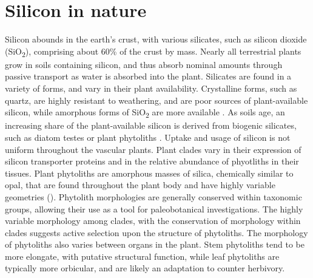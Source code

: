 \documentclass[12pt, letterpaper, ]{report}
\begin{document}
\section{Silicon in nature}

Silicon abounds in the earth’s crust, with various silicates, such as silicon dioxide (SiO\textsubscript{2}), comprising about 60\% of the crust by mass. Nearly all terrestrial plants grow in soils containing silicon, and thus absorb nominal amounts through passive transport as water is absorbed into the plant. Silicates are found in a variety of forms, and vary in their plant availability. Crystalline forms, such as quartz, are highly resistant to weathering, and are poor sources of plant-available silicon, while amorphous forms of SiO\textsubscript{2} are more available \cite{fraysse_surface_2009}. As soils age, an increasing share of the plant-available silicon is derived from biogenic silicates, such as diatom testes or plant phytoliths \cite{de_tombeur_plants_2020}. Uptake and usage of silicon is not uniform throughout the vascular plants. Plant clades vary in their expression of silicon transporter proteins and in the relative abundance of phyotliths in their tissues. Plant phytoliths are amorphous masses of silica, chemically similar to opal, that are found throughout the plant body and have highly variable geometries (\cite{piperno_phytoliths_2006}). Phytolith morphologies are generally conserved within taxonomic groups, allowing their use as a tool for paleobotanical investigations. The highly variable morphology among clades, with the conservation of morphology within clades suggests active selection upon the structure of phytoliths. The morphology of phytoliths also varies between organs in the plant. Stem phytoliths tend to be more elongate, with putative structural function, while leaf phytoliths are typically more orbicular, and are likely an adaptation to counter herbivory.
\end{document}
